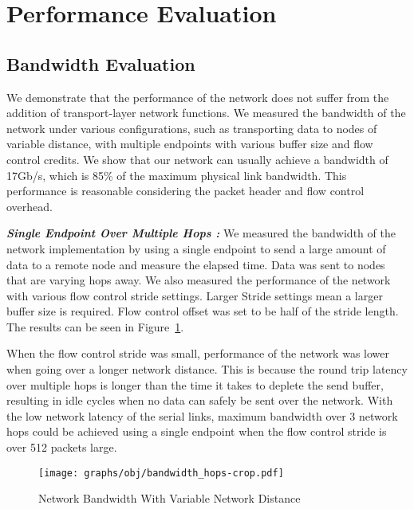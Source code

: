 \section{Performance Evaluation}
\label{sec:results}

\subsection{Bandwidth Evaluation}


We demonstrate that the performance of the network does not suffer from the
addition of transport-layer network functions. We measured the bandwidth of the
network under various configurations, such as transporting data to nodes of
variable distance, with multiple endpoints with various buffer size and flow
control credits. We show that our network can usually achieve a bandwidth of
17Gb/s, which is 85\% of the maximum physical link bandwidth. This performance
is reasonable considering the packet header and flow control overhead.


\emph{\bf{Single Endpoint Over Multiple Hops :}}
We measured the bandwidth of the network implementation by using a single
endpoint to send a large amount of data to a remote node and measure the elapsed
time. Data was sent to nodes that are varying hops away. We also measured the
performance of the network with various flow control stride settings. Larger
Stride settings mean a larger buffer size is required. Flow control offset
was set to be half of the stride length. The results can be seen in
Figure~\ref{fig:bandwidth_hops}. 

When the flow control stride was small, performance of the network was lower
when going over a longer network distance. This is because the round trip
latency over multiple hops is longer than the time it takes to deplete the send
buffer, resulting in idle cycles when no data can safely be sent over the
network. With the low network latency of the serial links, maximum bandwidth
over 3 network hops could be achieved using a single endpoint when the flow
control stride is over 512 packets large.

\begin{figure}[t]
	\begin{center}
	\texttt{[image: graphs/obj/bandwidth\_hops-crop.pdf]}
	\caption{Network Bandwidth With Variable Network Distance}
	\label{fig:bandwidth_hops}
	\end{center}
\end{figure}

